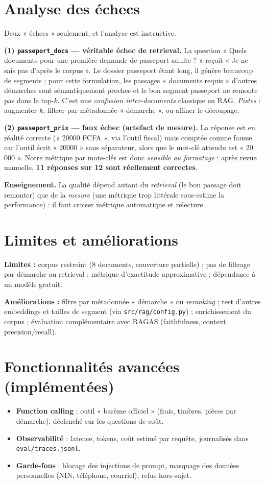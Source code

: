 \documentclass[11pt,a4paper]{article}
\begin{document}
\section{Analyse des échecs}
Deux « échecs » seulement, et l'analyse est instructive.

\textbf{(1) \texttt{passeport\_docs} — véritable échec de retrieval.}
La question « Quels documents pour une première demande de passeport adulte ? » reçoit
« Je ne sais pas d'après le corpus ». Le dossier passeport étant long, il génère beaucoup de
segments ; pour cette formulation, les passages « documents requis » d'autres démarches sont
sémantiquement proches et le bon segment passeport ne remonte pas dans le top-$k$. C'est une
\emph{confusion inter-documents} classique en RAG. \emph{Pistes} : augmenter $k$, filtrer par
métadonnée « démarche », ou affiner le découpage.

\textbf{(2) \texttt{passeport\_prix} — faux échec (artefact de mesure).}
La réponse est en réalité correcte (« 20000 FCFA », via l'outil fiscal) mais comptée comme
fausse car l'outil écrit « 20000 » sans séparateur, alors que le mot-clé attendu est
« 20\,000 ». Notre métrique par mots-clés est donc \emph{sensible au formatage} : après
revue manuelle, \textbf{11 réponses sur 12 sont réellement correctes}.

\textbf{Enseignement.} La qualité dépend autant du \emph{retrieval} (le bon passage doit
remonter) que de la \emph{mesure} (une métrique trop littérale sous-estime la performance) :
il faut croiser métrique automatique et relecture.

\section{Limites et améliorations}
\textbf{Limites :} corpus restreint (8 documents, couverture partielle) ; pas de filtrage par
démarche au retrieval ; métrique d'exactitude approximative ; dépendance à un modèle gratuit.

\textbf{Améliorations :} filtre par métadonnée « démarche » ou \emph{reranking} ; test
d'autres embeddings et tailles de segment (via \texttt{src/rag/config.py}) ; enrichissement
du corpus ; évaluation complémentaire avec RAGAS (faithfulness, context precision/recall).

\section{Fonctionnalités avancées (implémentées)}
\begin{itemize}
  \item \textbf{Function calling} : outil « barème officiel » (frais, timbres, pièces par démarche), déclenché sur les questions de coût.
  \item \textbf{Observabilité} : latence, tokens, coût estimé par requête, journalisés dans \texttt{eval/traces.jsonl}.
  \item \textbf{Garde-fous} : blocage des injections de prompt, masquage des données personnelles (NIN, téléphone, courriel), refus hors-sujet.
\end{itemize}
\end{document}

